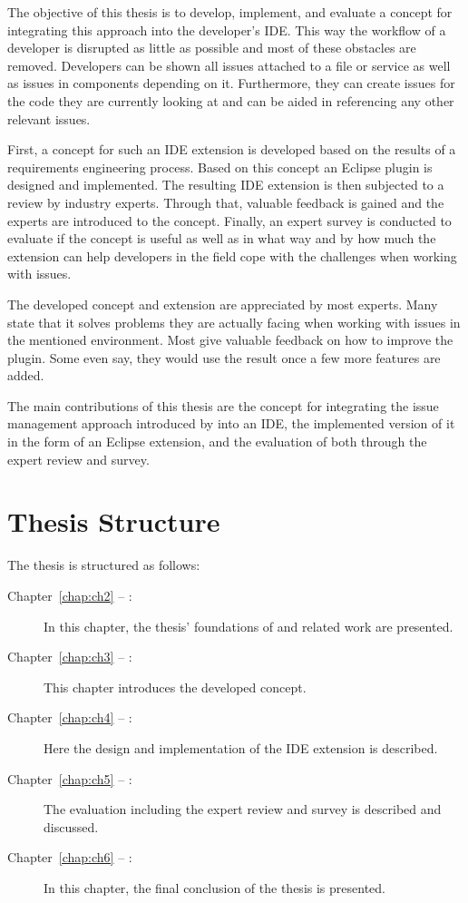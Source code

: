 The objective of this thesis is to develop, implement, and evaluate a concept for integrating this approach into the developer's \gls{IDE}.
This way the workflow of a developer is disrupted as little as possible and most of these obstacles are removed.
Developers can be shown all issues attached to a file or service as well as issues in components depending on it.
Furthermore, they can create issues for the code they are currently looking at and can be aided in referencing any other relevant issues. 

First, a concept for such an \gls{IDE} extension is developed based on the results of a requirements engineering process.
Based on this concept an \gls{Eclipse} plugin is designed and implemented.
The resulting \gls{IDE} extension is then subjected to a review by industry experts.
Through that, valuable feedback is gained and the experts are introduced to the concept.
Finally, an expert survey is conducted to evaluate if the concept is useful 
as well as in what way and by how much the extension can help developers in the field cope with the challenges when working with issues.

The developed concept and extension are appreciated by most experts.
Many state that it solves problems they are actually facing when working with issues in the mentioned environment.
Most give valuable feedback on how to improve the plugin.
Some even say, they would use the result once a few more features are added.

The main contributions of this thesis are the concept for integrating the issue management approach introduced by \cite{Speth2019} into an \gls{IDE},
the implemented version of it in the form of an \gls{Eclipse} extension, and the evaluation of both through the expert review and survey.

\section*{Thesis Structure}
The thesis is structured as follows:
\begin{description}
	\item[Chapter~\ref{chap:ch2} -- :] In this chapter, the thesis' foundations of and related work are presented.
	\item[Chapter~\ref{chap:ch3} -- :] This chapter introduces the developed concept.
	\item[Chapter~\ref{chap:ch4} -- :] Here the design and implementation of the \gls{IDE} extension is described.
	\item[Chapter~\ref{chap:ch5} -- :] The evaluation including the expert review and survey is described and discussed.
	\item[Chapter~\ref{chap:ch6} -- :] In this chapter, the final conclusion of the thesis is presented.
\end{description}